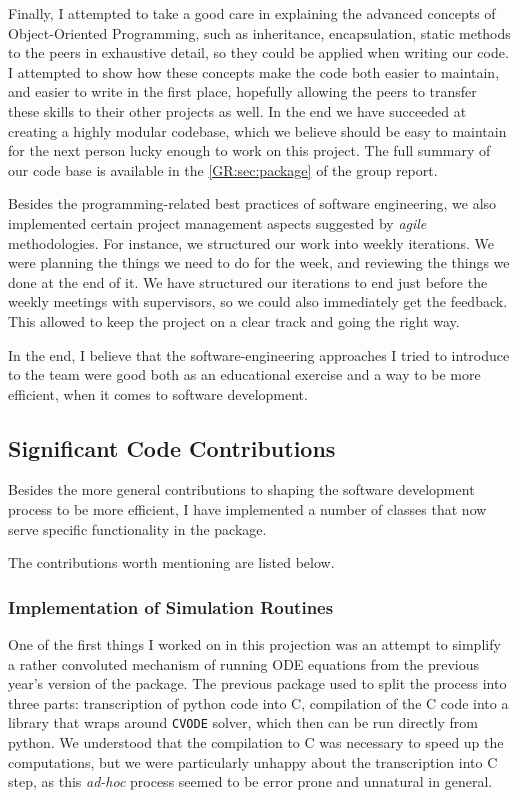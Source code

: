 Finally, I attempted to take a good care in explaining the advanced concepts of Object-Oriented Programming, such as inheritance, encapsulation, static methods to the peers in exhaustive detail, so they could be applied when writing our code. 
I attempted to show how these concepts make the code both easier to maintain, and easier to write in the first place, hopefully allowing the peers to transfer these skills to their other projects as well.
In the end we have succeeded at creating a highly modular codebase, which we believe should be easy to maintain for the next person lucky enough to work on this project. The full summary of our code base is available in the \autoref*{GR:sec:package} of the group report.

Besides the programming-related best practices of software engineering, we also implemented certain project management aspects suggested by \emph{agile} methodologies. 
For instance, we structured our work into weekly iterations. We were planning the things we need to do for the week, and reviewing the things we done at the end of it. 
We have structured our iterations to end just before the weekly meetings with supervisors, so we could also immediately get the feedback.
This allowed to keep the project on a clear track and going the right way.


In the end, I believe that the software-engineering approaches I tried to introduce to the team were good both as an educational exercise and a way to be more efficient, when it comes to software development.

\subsection{Significant Code Contributions}

Besides the more general contributions to shaping the software development process to be more efficient, 
I have implemented a number of classes that now serve specific functionality in the package.

The contributions worth mentioning are listed below.

\subsubsection{Implementation of Simulation Routines}

One of the first things I worked on in this projection was an attempt to simplify a rather convoluted mechanism of running ODE equations from the previous year's version of the package. 
The previous package used to split the process into three parts: transcription of python code into C, compilation of the C code into a library that wraps around \verb"CVODE" solver\cite{hindmarsh_sundials_2005}, which then can be run directly from python. 
We understood that the compilation to C was necessary to speed up the computations, but we were particularly unhappy about the transcription into C step, as this \emph{ad-hoc} process seemed to be error prone and unnatural in general.  

